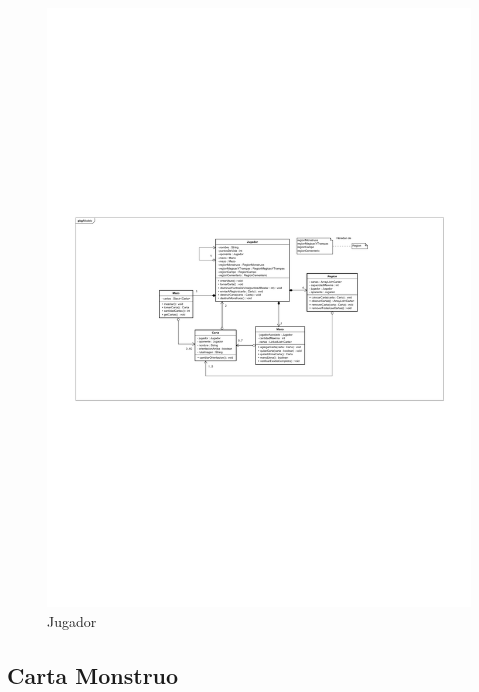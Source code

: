 \begin{figure}[H]
	\centering
	\includegraphics[scale=0.8]{includes/class_Jugador}
	\caption{Jugador}
	\label{class_Jugador}
\end{figure}

\subsection{Carta Monstruo}

